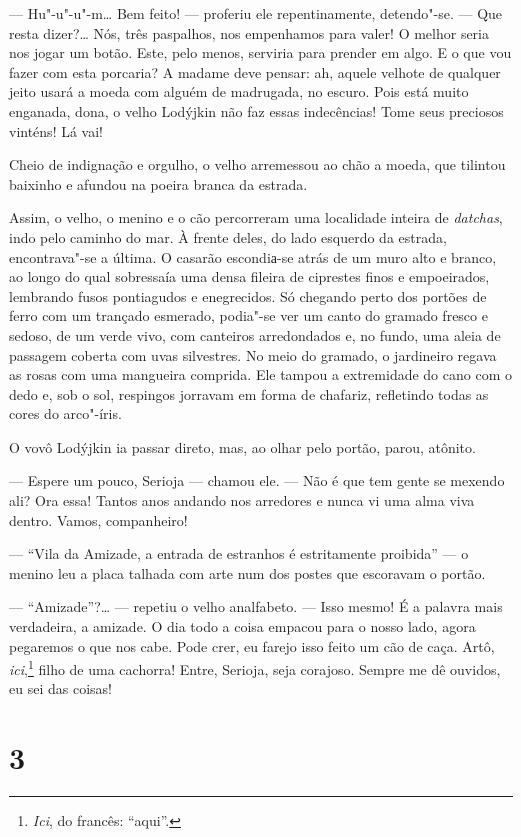 --- Hu"-u"-u"-m\ldots{} Bem feito! --- proferiu ele repentinamente, detendo"-se.
--- Que resta dizer?\ldots{} Nós, três paspalhos, nos empenhamos para valer!
O melhor seria nos jogar um botão. Este, pelo menos, serviria para
prender em algo. E o que vou fazer com esta porcaria? A madame deve
pensar: ah, aquele velhote de qualquer jeito usará a moeda com alguém de
madrugada, no escuro. Pois está muito enganada, dona, o velho Lodýjkin
não faz essas indecências! Tome seus preciosos vinténs! Lá vai!

Cheio de indignação e orgulho, o velho arremessou ao chão a moeda, que
tilintou baixinho e afundou na poeira branca da estrada.

Assim, o velho, o menino e o cão percorreram uma localidade inteira de
\emph{datchas}, indo pelo caminho do mar. À frente deles, do lado
esquerdo da estrada, encontrava"-se a última. O casarão escondiа-se atrás
de um muro alto e branco, ao longo do qual sobressaía uma densa fileira
de ciprestes finos e empoeirados, lembrando fusos pontiagudos e
enegrecidos. Só chegando perto dos portões de ferro com um trançado
esmerado, podia"-se ver um canto do gramado fresco e sedoso, de um verde
vivo, com canteiros arredondados e, no fundo, uma aleia de passagem
coberta com uvas silvestres. No meio do gramado, o jardineiro regava as
rosas com uma mangueira comprida. Ele tampou a extremidade do cano com o
dedo e, sob o sol, respingos jorravam em forma de chafariz, refletindo
todas as cores do arco"-íris.

O vovô Lodýjkin ia passar direto, mas, ao olhar pelo portão, parou,
atônito.

--- Espere um pouco, Serioja --- chamou ele. --- Não é que tem gente se
mexendo ali? Ora essa! Tantos anos andando nos arredores e nunca vi uma
alma viva dentro. Vamos, companheiro!

--- ``Vila da Amizade, a entrada de estranhos é estritamente proibida''
--- o menino leu a placa talhada com arte num dos postes que escoravam o
portão.

--- ``Amizade''?\ldots{} --- repetiu o velho analfabeto. --- Isso mesmo! É a
palavra mais verdadeira, a amizade. O dia todo a coisa empacou para o
nosso lado, agora pegaremos o que nos cabe. Pode crer, eu farejo isso
feito um cão de caça. Artô, \emph{ici},\footnote{\emph{Ici}, do francês:
  ``aqui''.} filho de uma cachorra! Entre, Serioja, seja corajoso.
Sempre me dê ouvidos, eu sei das coisas!

\section{3}

